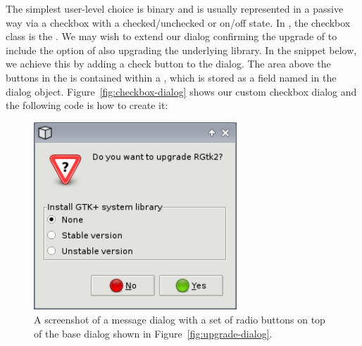 \documentclass[article,shortnames]{jss}
\begin{document}
The simplest user-level choice is binary and is usually represented in
a passive way via a checkbox with a checked/unchecked or  on/off 
state. In , the checkbox class is the
. We may wish to extend our dialog confirming the
upgrade of  to include the option of also upgrading the
underlying   library. In the snippet below, we
achieve this by adding a
check button to the dialog.  The area above the buttons in the
 is contained within a , which is stored
as a field named  in the dialog object. Figure~\ref{fig:checkbox-dialog} shows
our custom checkbox dialog and the following code is how to create it:

\begin{figure}[tbp]
  \begin{center}
    \includegraphics[width=3in]{radio-dialog.png}
    \caption{\label{fig:radio-dialog}A screenshot of a message dialog       with a set of radio buttons on top of the base dialog shown in       Figure~\ref{fig:upgrade-dialog}.}
  \end{center}
\end{figure}
\end{document}
